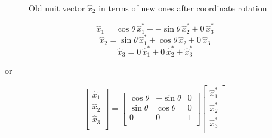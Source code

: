 \begin{figure}[h]
\begin{center}
\end{center}
\caption{Old unit vector $\hat{x}_2$ in terms of new ones after coordinate rotation}
\label{rotationofaxes6}
\end{figure}



$$ \hat{x}_1 = \cos\theta \, \hat{x}^*_1 + -\sin\theta \, \hat{x}^*_2 + 0 \, \hat{x}^*_3 $$ 
$$ \hat{x}_2 = \sin\theta \, \hat{x}^*_1 + \cos\theta \, \hat{x}_2 + 0 \, \hat{x}_3 $$ 
$$ \hat{x}_3 = 0 \, \hat{x}^*_1 + 0 \, \hat{x}^*_2 + \hat{x}^*_3 $$ 

or

\begin{equation*}
\left[ 
\begin{array}{l}
\hat{x}_1  \\
\hat{x}_2 \\
\hat{x}_3  \\
\end{array}
\right] 
= \left[ 
\begin{array}{lll}
 \cos\theta  &  -\sin\theta  & 0\\
 \sin\theta &  \cos\theta  & 0 \\
  0 & 0 & 1\\
\end{array}
\right] 
\left[ 
\begin{array}{l}
\hat{x}^*_1 \\
\hat{x}^*_2 \\
\hat{x}^*_3 \\
\end{array}
\right]
\end{equation*}

